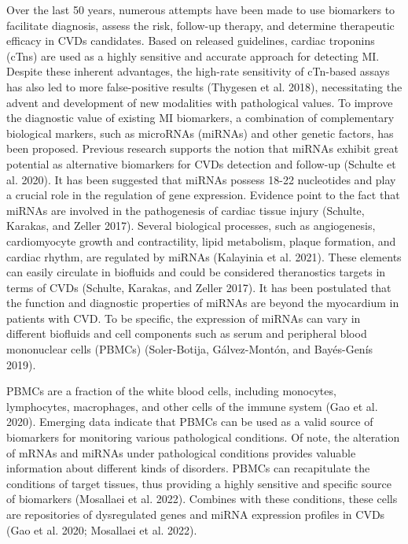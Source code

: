 \documentclass[
]{article}
\begin{document}
Over the last 50 years, numerous attempts have been made to use
biomarkers to facilitate diagnosis, assess the risk, follow-up therapy,
and determine therapeutic efficacy in CVDs candidates. Based on released
guidelines, cardiac troponins (cTns) are used as a highly sensitive and
accurate approach for detecting MI. Despite these inherent advantages,
the high-rate sensitivity of cTn-based assays has also led to more
false-positive results (Thygesen et al. 2018), necessitating the advent
and development of new modalities with pathological values. To improve
the diagnostic value of existing MI biomarkers, a combination of
complementary biological markers, such as microRNAs (miRNAs) and other
genetic factors, has been proposed. Previous research supports the
notion that miRNAs exhibit great potential as alternative biomarkers for
CVDs detection and follow-up (Schulte et al. 2020). It has been
suggested that miRNAs possess 18-22 nucleotides and play a crucial role
in the regulation of gene expression. Evidence point to the fact that
miRNAs are involved in the pathogenesis of cardiac tissue injury
(Schulte, Karakas, and Zeller 2017). Several biological processes, such
as angiogenesis, cardiomyocyte growth and contractility, lipid
metabolism, plaque formation, and cardiac rhythm, are regulated by
miRNAs (Kalayinia et al. 2021). These elements can easily circulate in
biofluids and could be considered theranostics targets in terms of CVDs
(Schulte, Karakas, and Zeller 2017). It has been postulated that the
function and diagnostic properties of miRNAs are beyond the myocardium
in patients with CVD. To be specific, the expression of miRNAs can vary
in different biofluids and cell components such as serum and peripheral
blood mononuclear cells (PBMCs) (Soler-Botija, Gálvez-Montón, and
Bayés-Genís 2019).

PBMCs are a fraction of the white blood cells, including monocytes,
lymphocytes, macrophages, and other cells of the immune system (Gao et
al. 2020). Emerging data indicate that PBMCs can be used as a valid
source of biomarkers for monitoring various pathological conditions. Of
note, the alteration of mRNAs and miRNAs under pathological conditions
provides valuable information about different kinds of disorders. PBMCs
can recapitulate the conditions of target tissues, thus providing a
highly sensitive and specific source of biomarkers (Mosallaei et al.
2022). Combines with these conditions, these cells are repositories of
dysregulated genes and miRNA expression profiles in CVDs (Gao et al.
2020; Mosallaei et al. 2022).
\end{document}
